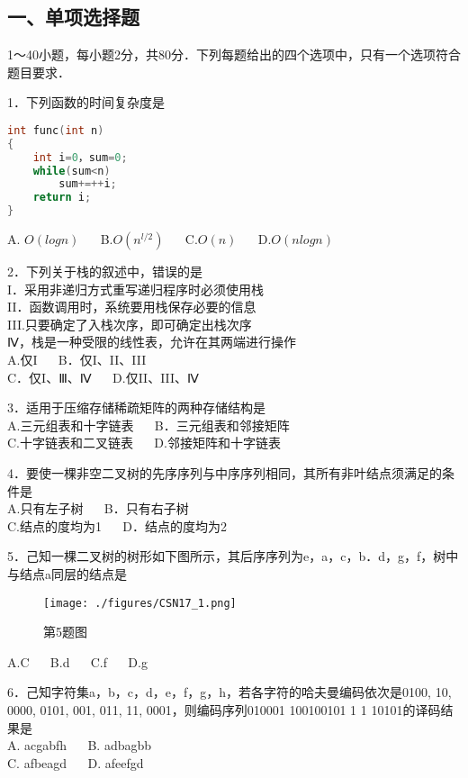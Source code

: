 

\subsection{一、单项选择题}
1～40小题，每小题2分，共80分．下列每题给出的四个选项中，只有一个选项符合题目要求．

1．下列函数的时间复杂度是 \\
\begin{lstlisting}[language=cpp]
int func(int n)
{
    int i=0，sum=0;
    while(sum<n)
        sum+=++i;
    return i;
}
\end{lstlisting}
A. $O(log n)$ $\quad$ B.$O(n^{l/2})$  $\quad$  C.$O(n)$  $\quad$  D.$O(nlogn)$

2．下列关于栈的叙述中，错误的是 \\
I．采用非递归方式重写递归程序时必须使用栈 \\
II．函数调用时，系统要用栈保存必要的信息 \\
III.只要确定了入栈次序，即可确定出栈次序 \\
Ⅳ，栈是一种受限的线性表，允许在其两端进行操作 \\
A.仅I  $\quad$  B．仅I、II、III \\
C．仅I、Ⅲ、Ⅳ  $\quad$  D.仅II、III、Ⅳ

3．适用于压缩存储稀疏矩阵的两种存储结构是 \\
A.三元组表和十字链表 $\quad$ B．三元组表和邻接矩阵 \\
C.十字链表和二叉链表 $\quad$ D.邻接矩阵和十字链表

4．要使一棵非空二叉树的先序序列与中序序列相同，其所有非叶结点须满足的条件是 \\
A.只有左子树  $\quad$  B．只有右子树 \\
C.结点的度均为1 $\quad$ D．结点的度均为2

5．己知一棵二叉树的树形如下图所示，其后序序列为e，a，c，b．d，g，f，树中与结点a同层的结点是 \\
\begin{figure}[ht]
\centering
\texttt{[image: ./figures/CSN17\_1.png]}
\caption{第5题图} \label{CSN17_fig1}
\end{figure}
A.C $\quad$ B.d $\quad$ C.f $\quad$ D.g

6．己知字符集{a，b，c，d，e，f，g，h}，若各字符的哈夫曼编码依次是0100, 10, 0000, 0101, 001, 011, 11, 0001，则编码序列010001 100100101 1 1 10101的译码结果是 \\
A. acgabfh  $\quad$  B. adbagbb  \\
C. afbeagd  $\quad$  D. afeefgd

